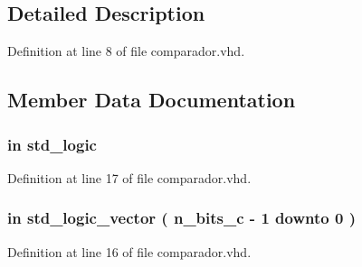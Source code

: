 \subsection{Detailed Description}


Definition at line 8 of file comparador.\+vhd.



\subsection{Member Data Documentation}
\hypertarget{classcomparador_af9b8278b961604ab62a822537a109adb}{}
\subsubsection[{amost}]{ {\bfseries \textcolor{keywordflow}{in}\textcolor{vhdlchar}{ }} {\bfseries \textcolor{comment}{std\+\_\+logic}\textcolor{vhdlchar}{ }} \hspace{0.3cm}{\ttfamily [Port]}}\label{classcomparador_af9b8278b961604ab62a822537a109adb}


Definition at line 17 of file comparador.\+vhd.

\hypertarget{classcomparador_a0808bf3e7965a8ee90dec6604647f179}{}
\subsubsection[{c}]{ {\bfseries \textcolor{keywordflow}{in}\textcolor{vhdlchar}{ }} {\bfseries \textcolor{comment}{std\+\_\+logic\+\_\+vector}\textcolor{vhdlchar}{ }\textcolor{vhdlchar}{(}\textcolor{vhdlchar}{ }\textcolor{vhdlchar}{ }\textcolor{vhdlchar}{ }\textcolor{vhdlchar}{ }{\bfseries {\bf n\+\_\+bits\+\_\+c}} \textcolor{vhdlchar}{-\/}\textcolor{vhdlchar}{ } \textcolor{vhdldigit}{1} \textcolor{vhdlchar}{ }\textcolor{keywordflow}{downto}\textcolor{vhdlchar}{ }\textcolor{vhdlchar}{ } \textcolor{vhdldigit}{0} \textcolor{vhdlchar}{ }\textcolor{vhdlchar}{)}\textcolor{vhdlchar}{ }} \hspace{0.3cm}{\ttfamily [Port]}}\label{classcomparador_a0808bf3e7965a8ee90dec6604647f179}


Definition at line 16 of file comparador.\+vhd.

\hypertarget{classcomparador_a4a4609c199d30b3adebbeb3a01276ec5}{}
